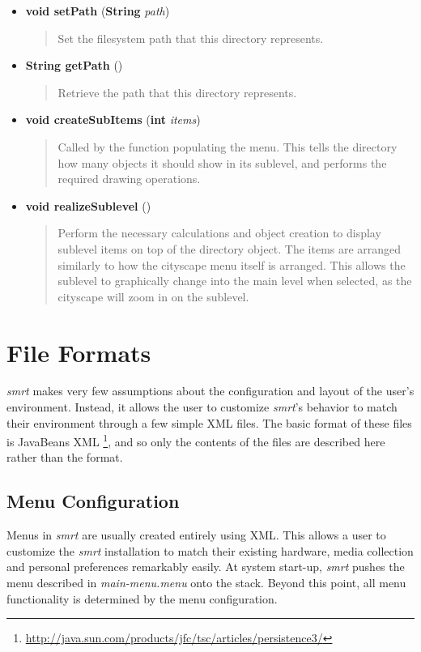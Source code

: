 \documentclass[letterpaper, titlepage, 11pt]{article}
\begin{document}
\begin{itemize}
\item[] \textbf{void setPath} (\textbf{String} \textit{path})
\begin{quotation}
Set the filesystem path that this directory represents.
\end{quotation}

\item[] \textbf{String getPath} ()
\begin{quotation}
Retrieve the path that this directory represents.
\end{quotation}

\pagebreak %

\item[] \textbf{void createSubItems} (\textbf{int} \textit{items})
\begin{quotation}
Called by the function populating the menu.  This tells the directory how many
objects it should show in its sublevel, and performs the required drawing
operations.
\end{quotation}

\item[] \textbf{void realizeSublevel} ()
\begin{quotation}
Perform the necessary calculations and object creation to display sublevel items
on top of the directory object.  The items are arranged similarly to how the
cityscape menu itself is arranged.  This allows the sublevel to graphically
change into the main level when selected, as the cityscape will zoom in on
the sublevel.
\end{quotation}
\end{itemize}

\section{File Formats}
\label{FileFormats}
\textit{smrt} makes very few assumptions about the configuration and layout of
the user's environment.  Instead, it allows the user to customize
\textit{smrt}'s behavior to match their environment through a few simple XML
files.  The basic format of these files is JavaBeans XML
\footnote{\url{http://java.sun.com/products/jfc/tsc/articles/persistence3/}},
and so only the contents of the files are described here rather than the format.

\subsection{Menu Configuration}
\label{MenuConfig}
Menus in \textit{smrt} are usually created entirely using XML.  This allows a
user to customize the \textit{smrt} installation to match their existing
hardware, media collection and personal preferences remarkably easily.  At
system start-up, \textit{smrt} pushes the menu described in
\textit{main-menu.menu} onto the stack.  Beyond this point, all menu
functionality is determined by the menu configuration.
\end{document}

